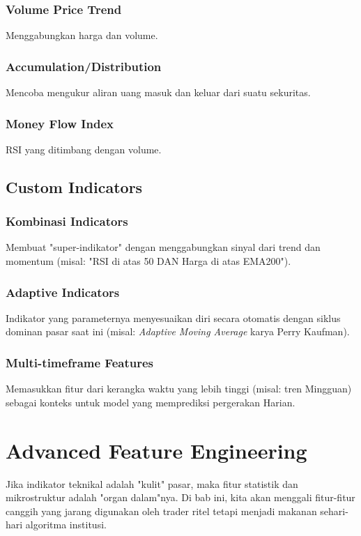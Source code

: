 \documentclass[12pt,a4paper]{book}
\begin{document}
\subsection{Volume Price Trend}
Menggabungkan harga dan volume.

\subsection{Accumulation/Distribution}
Mencoba mengukur aliran uang masuk dan keluar dari suatu sekuritas.

\subsection{Money Flow Index}
RSI yang ditimbang dengan volume.

\section{Custom Indicators}
\subsection{Kombinasi Indicators}
Membuat "super-indikator" dengan menggabungkan sinyal dari trend dan momentum (misal: "RSI di atas 50 DAN Harga di atas EMA200").

\subsection{Adaptive Indicators}
Indikator yang parameternya menyesuaikan diri secara otomatis dengan siklus dominan pasar saat ini (misal: \textit{Adaptive Moving Average} karya Perry Kaufman).

\subsection{Multi-timeframe Features}
Memasukkan fitur dari kerangka waktu yang lebih tinggi (misal: tren Mingguan) sebagai konteks untuk model yang memprediksi pergerakan Harian.


\chapter{Advanced Feature Engineering}
Jika indikator teknikal adalah "kulit" pasar, maka fitur statistik dan mikrostruktur adalah "organ dalam"nya. Di bab ini, kita akan menggali fitur-fitur canggih yang jarang digunakan oleh trader ritel tetapi menjadi makanan sehari-hari algoritma institusi.
\end{document}
